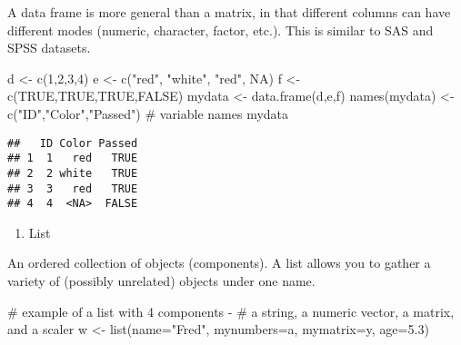 \documentclass[]{article}
\newenvironment{Shaded}{\begin{snugshade}}{\end{snugshade}}
\newcommand{\KeywordTok}[1]{\textcolor[rgb]{0.94,0.87,0.69}{{#1}}}
\newcommand{\DataTypeTok}[1]{\textcolor[rgb]{0.87,0.87,0.75}{{#1}}}
\newcommand{\DecValTok}[1]{\textcolor[rgb]{0.86,0.86,0.80}{{#1}}}
\newcommand{\FloatTok}[1]{\textcolor[rgb]{0.75,0.75,0.82}{{#1}}}
\newcommand{\StringTok}[1]{\textcolor[rgb]{0.80,0.58,0.58}{{#1}}}
\newcommand{\CommentTok}[1]{\textcolor[rgb]{0.50,0.62,0.50}{{#1}}}
\newcommand{\OtherTok}[1]{\textcolor[rgb]{0.94,0.94,0.56}{{#1}}}
\newcommand{\NormalTok}[1]{\textcolor[rgb]{0.80,0.80,0.80}{{#1}}}
\begin{document}
A data frame is more general than a matrix, in that different columns
can have different modes (numeric, character, factor, etc.). This is
similar to SAS and SPSS datasets.

\begin{Shaded}
\begin{Highlighting}[]
\NormalTok{d <-}\StringTok{ }\KeywordTok{c}\NormalTok{(}\DecValTok{1}\NormalTok{,}\DecValTok{2}\NormalTok{,}\DecValTok{3}\NormalTok{,}\DecValTok{4}\NormalTok{)}
\NormalTok{e <-}\StringTok{ }\KeywordTok{c}\NormalTok{(}\StringTok{"red"}\NormalTok{, }\StringTok{"white"}\NormalTok{, }\StringTok{"red"}\NormalTok{, }\OtherTok{NA}\NormalTok{)}
\NormalTok{f <-}\StringTok{ }\KeywordTok{c}\NormalTok{(}\OtherTok{TRUE}\NormalTok{,}\OtherTok{TRUE}\NormalTok{,}\OtherTok{TRUE}\NormalTok{,}\OtherTok{FALSE}\NormalTok{)}
\NormalTok{mydata <-}\StringTok{ }\KeywordTok{data.frame}\NormalTok{(d,e,f)}
\KeywordTok{names}\NormalTok{(mydata) <-}\StringTok{ }\KeywordTok{c}\NormalTok{(}\StringTok{"ID"}\NormalTok{,}\StringTok{"Color"}\NormalTok{,}\StringTok{"Passed"}\NormalTok{) }\CommentTok{# variable names}
\NormalTok{mydata}
\end{Highlighting}
\end{Shaded}

\begin{verbatim}
##   ID Color Passed
## 1  1   red   TRUE
## 2  2 white   TRUE
## 3  3   red   TRUE
## 4  4  <NA>  FALSE
\end{verbatim}

\begin{enumerate}
\def\labelenumi{\arabic{enumi}.}
\setcounter{enumi}{4}
\itemsep1pt\parskip0pt
\item
  List
\end{enumerate}

An ordered collection of objects (components). A list allows you to
gather a variety of (possibly unrelated) objects under one name.

\begin{Shaded}
\begin{Highlighting}[]
\CommentTok{# example of a list with 4 components - }
\CommentTok{# a string, a numeric vector, a matrix, and a scaler }
\NormalTok{w <-}\StringTok{ }\KeywordTok{list}\NormalTok{(}\DataTypeTok{name=}\StringTok{"Fred"}\NormalTok{, }\DataTypeTok{mynumbers=}\NormalTok{a, }\DataTypeTok{mymatrix=}\NormalTok{y, }\DataTypeTok{age=}\FloatTok{5.3}\NormalTok{)}
\end{Highlighting}
\end{Shaded}
\end{document}
